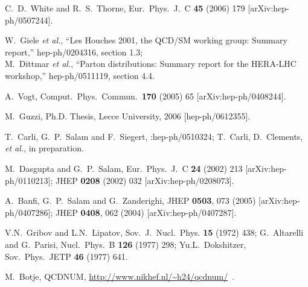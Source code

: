 \documentclass[12pt]{article}
\begin{document}
\begin{thebibliography}{99}
  C.~D.~White and R.~S.~Thorne,
  Eur.\ Phys.\ J.\ C {\bf 45} (2006) 179
  [arXiv:hep-ph/0507244].

  W.~Giele {\it et al.},
  ``Les Houches 2001, the QCD/SM working group: Summary report,''
  hep-ph/0204316, section 1.3;\\
  M.~Dittmar {\it et al.},
  ``Parton distributions: Summary report for the HERA-LHC workshop,''
  hep-ph/0511119, section 4.4.


  A.~Vogt,
  Comput.\ Phys.\ Commun.\  {\bf 170} (2005) 65
  [arXiv:hep-ph/0408244].


  M.~Guzzi, Ph.D. Thesis, Lecce University, 2006 [hep-ph/0612355].

  T.~Carli, G.~P.~Salam and F.~Siegert,
  :hep-ph/0510324;
  T.~Carli, D.~Clements, {\it et al.}, in preparation.

  M.~Dasgupta and G.~P.~Salam,
  Eur.\ Phys.\ J.\  C {\bf 24} (2002) 213
  [arXiv:hep-ph/0110213];
  JHEP {\bf 0208} (2002) 032
  [arXiv:hep-ph/0208073].

  A.~Banfi, G.~P.~Salam and G.~Zanderighi,
  JHEP {\bf 0503}, 073 (2005)
  [arXiv:hep-ph/0407286];
%
  JHEP {\bf 0408}, 062 (2004)
  [arXiv:hep-ph/0407287].


V.N.~Gribov and L.N.~Lipatov, 
Sov.\ J.\ Nucl.\ Phys. {\bf 15} (1972) 438;
G.~Altarelli and G.~Parisi, 
Nucl.\ Phys.\ B {\bf 126} (1977) 298;
Yu.L.~Dokshitzer, 
Sov.\ Phys.\ JETP {\bf 46} (1977) 641.


  M.~Botje, QCDNUM, \url{http://www.nikhef.nl/~h24/qcdnum/}~.

\end{thebibliography}
\end{document}
